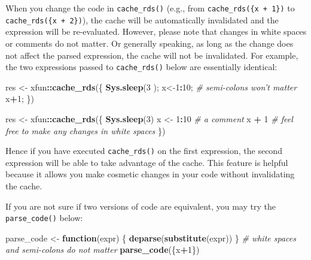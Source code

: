 \documentclass[
  11pt,
]{krantz}
\newenvironment{Shaded}{\begin{snugshade}}{\end{snugshade}}
\newcommand{\CommentTok}[1]{\textcolor[rgb]{0.37,0.37,0.37}{\textit{#1}}}
\newcommand{\ControlFlowTok}[1]{\textcolor[rgb]{0.27,0.27,0.27}{\textbf{#1}}}
\newcommand{\DecValTok}[1]{\textcolor[rgb]{0.06,0.06,0.06}{#1}}
\newcommand{\KeywordTok}[1]{\textcolor[rgb]{0.27,0.27,0.27}{\textbf{#1}}}
\newcommand{\NormalTok}[1]{#1}
\newcommand{\OperatorTok}[1]{\textcolor[rgb]{0.43,0.43,0.43}{\textbf{#1}}}
\newcommand{\StringTok}[1]{\textcolor[rgb]{0.5,0.5,0.5}{#1}}
\begin{document}
When you change the code in \texttt{cache\_rds()} (e.g., from \texttt{cache\_rds(\{x\ +\ 1\})} to \texttt{cache\_rds(\{x\ +\ 2\})}), the cache will be automatically invalidated and the expression will be re-evaluated. However, please note that changes in white spaces or comments do not matter. Or generally speaking, as long as the change does not affect the parsed expression, the cache will not be invalidated. For example, the two expressions passed to \texttt{cache\_rds()} below are essentially identical:

\begin{Shaded}
\begin{Highlighting}[]
\NormalTok{res <-}\StringTok{ }\NormalTok{xfun}\OperatorTok{::}\KeywordTok{cache_rds}\NormalTok{(\{}
  \KeywordTok{Sys.sleep}\NormalTok{(}\DecValTok{3}\NormalTok{  );}
\NormalTok{  x<-}\DecValTok{1}\OperatorTok{:}\DecValTok{10}\NormalTok{;  }\CommentTok{# semi-colons won't matter}
\NormalTok{  x}\OperatorTok{+}\DecValTok{1}\NormalTok{;}
\NormalTok{\})}

\NormalTok{res <-}\StringTok{ }\NormalTok{xfun}\OperatorTok{::}\KeywordTok{cache_rds}\NormalTok{(\{}
  \KeywordTok{Sys.sleep}\NormalTok{(}\DecValTok{3}\NormalTok{)}
\NormalTok{  x <-}\StringTok{ }\DecValTok{1}\OperatorTok{:}\DecValTok{10}  \CommentTok{# a comment}
\NormalTok{  x }\OperatorTok{+}
\StringTok{    }\DecValTok{1}  \CommentTok{# feel free to make any changes in white spaces}
\NormalTok{\})}
\end{Highlighting}
\end{Shaded}

Hence if you have executed \texttt{cache\_rds()} on the first expression, the second expression will be able to take advantage of the cache. This feature is helpful because it allows you make cosmetic changes in your code without invalidating the cache.

If you are not sure if two versions of code are equivalent, you may try the \texttt{parse\_code()} below:

\begin{Shaded}
\begin{Highlighting}[]
\NormalTok{parse_code <-}\StringTok{ }\ControlFlowTok{function}\NormalTok{(expr) \{}
  \KeywordTok{deparse}\NormalTok{(}\KeywordTok{substitute}\NormalTok{(expr))}
\NormalTok{\}}
\CommentTok{# white spaces and semi-colons do not matter}
\KeywordTok{parse_code}\NormalTok{(\{x}\OperatorTok{+}\DecValTok{1}\NormalTok{\})}
\end{Highlighting}
\end{Shaded}
\end{document}
